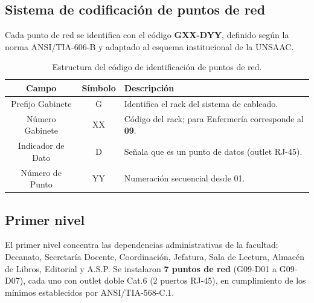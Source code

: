 \subsection{Sistema de codificación de puntos de red}

Cada punto de red se identifica con el código \textbf{GXX-DYY}, definido según
la norma \mbox{ANSI/TIA-606-B} y adaptado al esquema institucional de la UNSAAC.

\begin{table}[H]
    \centering
    \caption{Estructura del código de identificación de puntos de red.}
    \label{tab:codigo_nodos}
    \begin{tabular}{|c|c|p{9cm}|}
        \hline
        \textbf{Campo} & \textbf{Símbolo} & \textbf{Descripción} \\
        \hline
        Prefijo Gabinete  & G  & Identifica el rack del sistema de cableado. \\
        \hline
        Número Gabinete   & XX & Código del rack; para Enfermería corresponde
                                  al \textbf{09}. \\
        \hline
        Indicador de Dato & D  & Señala que es un punto de datos (outlet RJ-45). \\
        \hline
        Número de Punto   & YY & Numeración secuencial desde 01. \\
        \hline
    \end{tabular}
\end{table}

\subsection{Primer nivel}

El primer nivel concentra las dependencias administrativas de la facultad: Decanato,
Secretaría Docente, Coordinación, Jefatura, Sala de Lectura, Almacén de Libros,
Editorial y A.S.P. Se instalaron \textbf{7 puntos de red} (G09-D01 a G09-D07),
cada uno con outlet doble Cat.6 (2 puertos RJ-45), en cumplimiento de los mínimos
establecidos por \mbox{ANSI/TIA-568-C.1}.

